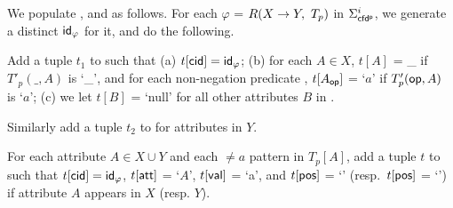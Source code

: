 We populate ,  and \Enc{\ne}  as follows. For each
\pCFD $\varphi$ = $R(X\rightarrow Y,\ T_p)$ in $\Sigma_{{\mathsf{cfd^p}}}^i$,
we generate a distinct  ${\mathsf{id}}_\varphi$ for it, and do the following.
\bi
\item[(1)] Add a tuple $t_1$ to  such that
(a) $t[\protect\mathsf{cid}] = {\mathsf{id}}_\varphi$; (b) for each $A\in X$,
$t[A]$ = \_ if $T'_p(\_,A)$ is `\_', and for each non-negation
predicate \op, $t[A_{{\mathsf{op}}}]$ = `$a$' if $T'_p({\mathsf{op}},A)$
is `\op $a$'; (c) we let $t[B]$ = `null' for all other attributes $B$
in .



\item[(2)] Similarly add a tuple $t_2$ to  for attributes in $Y$.


\item[(3)] For each attribute $A\in X\cup Y$ and each $\ne a$ pattern in
$T_p[A]$, add a tuple $t$ to \Enc{\ne} such that $t[\protect\mathsf{cid}] =
{\mathsf{id}}_\varphi$, $t[\protect\mathsf{att}]$ = `$A$', $t[\protect\mathsf{val}]$ = `a', and
$t[\protect\mathsf{pos}]$ = `\LHS' (resp.~$t[\protect\mathsf{pos}]$ = `\RHS') if attribute
$A$ appears in $X$ (resp. $Y$). \ei\vspace{-1ex}


